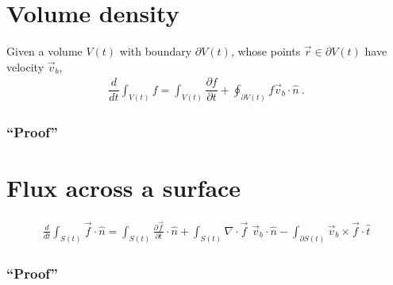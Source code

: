 \documentclass[letterpaper,10pt,english]{jupyterBook}
\begin{document}
\section{Volume density}
\label{\detokenize{ch/tensor-algebra-calculus/time-derivative-of-integrals:volume-density}}\label{\detokenize{ch/tensor-algebra-calculus/time-derivative-of-integrals:tensor-calculus-time-derivative-of-integrals-volume-density}}
\sphinxAtStartPar
{}
Given a volume \(V(t)\) with boundary \(\partial V(t)\), whose points \(\vec{r} \in \partial V(t)\) have velocity \(\vec{v}_b\),
\begin{equation*}
\begin{split}\dfrac{d}{dt} \int_{V(t)} f = \int_{V(t)} \dfrac{\partial f}{\partial t} + \oint_{\partial V(t)} f \vec{v}_b \cdot \hat{n} \ .\end{split}
\end{equation*}\subsubsection*{“Proof”}


\section{Flux across a surface}
\label{\detokenize{ch/tensor-algebra-calculus/time-derivative-of-integrals:flux-across-a-surface}}\label{\detokenize{ch/tensor-algebra-calculus/time-derivative-of-integrals:tensor-calculus-time-derivative-of-integrals-flux}}\begin{equation*}
\begin{split}\frac{d}{dt} \int_{S(t)} \vec{f} \cdot \hat{n} = \int_{S(t)} \frac{\partial \vec{f}}{\partial t} \cdot \hat{n} + \int_{S(t)} \nabla \cdot \vec{f} \,\, \vec{v}_b \cdot \hat{n} - \int_{\partial S(t)} \vec{v}_b \times \vec{f} \cdot \hat{t} \end{split}
\end{equation*}\subsubsection*{“Proof”}
\end{document}
